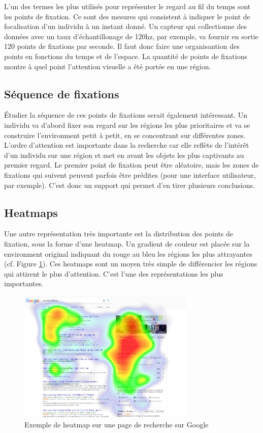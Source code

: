 \documentclass[12pt]{article}
\begin{document}
L'un des termes les plus utilisés pour représenter le regard au fil du temps
sont les points de fixation. Ce sont des mesures qui consistent à indiquer
le point de focalisation d'un individu à un instant donné. Un capteur qui
collectionne des données avec un taux d'échantillonage de 120hz, par exemple, va
fournir en sortie 120 points de fixations par seconde. Il faut donc faire une
organisantion des points en fonctions du temps et de l'espace. La quantité de
points de fixations montre à quel point l'attention visuelle a été portée en une
région.

\subsection{Séquence de fixations}

Étudier la séquence de ces points de fixations serait également intéressant. Un
individu va d'abord fixer son regard sur les régions les plus prioritaires et va
se construire l'environment petit à petit, en se concentrant sur différentes
zones. L'ordre d'attention est importante dans la recherche car elle reflète de
l'intérêt d'un individu sur une région et met en avant les objets les plus
captivants au premier regard. Le premier point de fixation peut être aléatoire,
mais les zones de fixations qui suivent peuvent parfois être prédites (pour
une interface utilisateur, par exemple). C'est donc un support qui permet d'en
tirer plusieurs conclusions.

\subsection{Heatmaps}

Une autre représentation très importante est la distribution des points de
fixation, sous la forme d'une heatmap. Un gradient de couleur est placée sur la
environment original indiquant du rouge au bleu les régions les plus
attrayantes (cf. Figure \ref{fig:heatmap}). Ces heatmaps sont un moyen très
simple de différencier les régions qui attirent le plus d'attention. C'est
l'une des représentations les plus importantes.

\begin{figure}[ht]
  \centering
  \includegraphics[width=0.75\textwidth,keepaspectratio=true]{heatmap.png}
  \caption{Exemple de heatmap sur une page de recherche sur Google
    \cite{img:heatmap}}
  \label{fig:heatmap}
\end{figure}
\end{document}
